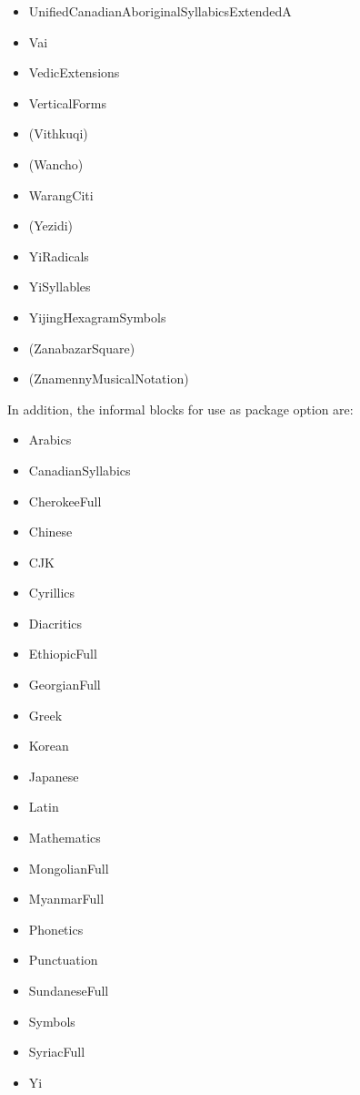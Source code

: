 \documentclass{article}
\newenvironment{itemlist}{%
  \begin{itemize}
  \setlength{\itemsep}{0pt}
  \setlength{\parsep}{0pt}
  \setlength{\topsep}{0pt}
  \setlength{\partopsep}{0pt}
  \setlength{\parskip}{0pt}
  \setlength{\labelsep}{5pt}}%
{
  \end{itemize}}
\begin{document}
\begin{multicols*}{2}
\begin{itemlist}
        \item UnifiedCanadianAboriginalSyllabicsExtendedA
        \item Vai
        \item VedicExtensions
        \item VerticalForms
        \item (Vithkuqi)
        \item (Wancho)
        \item WarangCiti
        \item (Yezidi)
        \item YiRadicals
        \item YiSyllables
        \item YijingHexagramSymbols
        \item (ZanabazarSquare)
        \item (ZnamennyMusicalNotation)
      \end{itemlist}
    \end{multicols*}

    In addition, the informal blocks for use as package option are:

    \begin{multicols*}{2}
      \begin{itemlist}
        \item Arabics
        \item CanadianSyllabics
        \item CherokeeFull
        \item Chinese
        \item CJK
        \item Cyrillics
        \item Diacritics
        \item EthiopicFull
        \item GeorgianFull
        \item Greek
        \item Korean
        \item Japanese
        \item Latin
        \item Mathematics
        \item MongolianFull
        \item MyanmarFull
        \item Phonetics
        \item Punctuation
        \item SundaneseFull
        \item Symbols
        \item SyriacFull
        \item Yi
      \end{itemlist}
    \end{multicols*}
\end{document}
